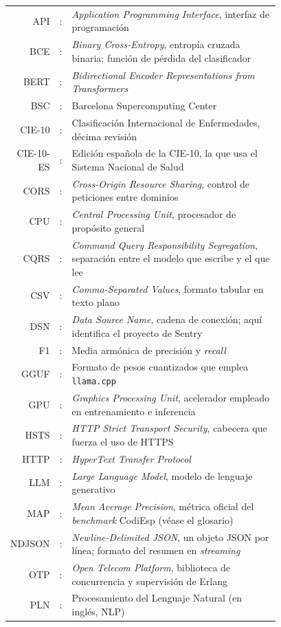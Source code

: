 \begin{tabular}{r r p{0.78\linewidth}}
API   & : & \emph{Application Programming Interface}, interfaz de programación \\
BCE   & : & \emph{Binary Cross-Entropy}, entropía cruzada binaria; función de pérdida del clasificador \\
BERT  & : & \emph{Bidirectional Encoder Representations from Transformers} \\
BSC   & : & Barcelona Supercomputing Center \\
CIE-10 & : & Clasificación Internacional de Enfermedades, décima revisión \\
CIE-10-ES & : & Edición española de la CIE-10, la que usa el Sistema Nacional de Salud \\
CORS  & : & \emph{Cross-Origin Resource Sharing}, control de peticiones entre dominios \\
CPU   & : & \emph{Central Processing Unit}, procesador de propósito general \\
CQRS  & : & \emph{Command Query Responsibility Segregation}, separación entre el modelo que escribe y el que lee \\
CSV   & : & \emph{Comma-Separated Values}, formato tabular en texto plano \\
DSN   & : & \emph{Data Source Name}, cadena de conexión; aquí identifica el proyecto de Sentry \\
F1    & : & Media armónica de precisión y \emph{recall} \\
GGUF  & : & Formato de pesos cuantizados que emplea \texttt{llama.cpp} \\
GPU   & : & \emph{Graphics Processing Unit}, acelerador empleado en entrenamiento e inferencia \\
HSTS  & : & \emph{HTTP Strict Transport Security}, cabecera que fuerza el uso de HTTPS \\
HTTP  & : & \emph{HyperText Transfer Protocol} \\
LLM   & : & \emph{Large Language Model}, modelo de lenguaje generativo \\
MAP   & : & \emph{Mean Average Precision}, métrica oficial del \emph{benchmark} CodiEsp (véase el glosario) \\
NDJSON & : & \emph{Newline-Delimited JSON}, un objeto JSON por línea; formato del resumen en \emph{streaming} \\
OTP   & : & \emph{Open Telecom Platform}, biblioteca de concurrencia y supervisión de Erlang \\
PLN   & : & Procesamiento del Lenguaje Natural (en inglés, NLP) \\

\end{tabular}
